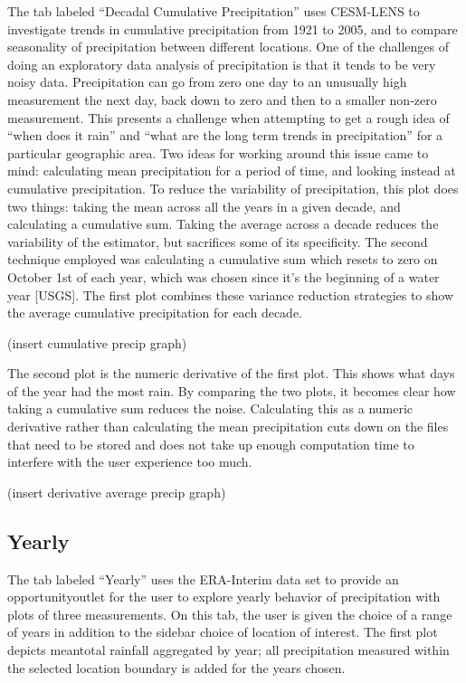 \documentclass[10pt,letterpaper]{article}
\begin{document}
The tab labeled “Decadal Cumulative Precipitation” uses CESM-LENS to investigate trends in cumulative precipitation from 1921 to 2005, and to compare seasonality of precipitation between different locations. One of the challenges of doing an exploratory data analysis of precipitation is that it tends to be very noisy data. Precipitation can go from zero one day to an unusually high measurement the next day, back down to zero and then to a smaller non-zero measurement. This presents a challenge when attempting to get a rough idea of “when does it rain” and “what are the long term trends in precipitation” for a particular geographic area. Two ideas for working around this issue came to mind: calculating mean precipitation for a period of time, and looking instead at cumulative precipitation.
        	To reduce the variability of precipitation, this
plot does two things: taking the mean across all the years in a given decade, and calculating a cumulative sum. Taking the average across a decade reduces the variability of the estimator, but sacrifices some of its specificity. The second technique employed was calculating a cumulative  sum which resets to zero on October 1st of each year, which was chosen since it’s the beginning of a water year [USGS]. The first plot combines these variance reduction strategies to show the average cumulative precipitation for each decade.

(insert cumulative precip graph)

The second plot is the numeric derivative of the first plot. This shows what days of the year had the most rain. By comparing the two plots, it becomes clear how taking a cumulative sum reduces the noise. Calculating this as a numeric derivative rather than calculating the mean precipitation cuts down on the files that need to be stored and does not take up enough computation time to interfere with the user experience too much.

(insert derivative average precip graph)

\subsection*{Yearly}

The tab labeled “Yearly” uses the ERA-Interim data set to provide an opportunityoutlet for the user to explore yearly behavior of precipitation with plots of three measurements. On this tab, the user is given the choice of a range of years in addition to the sidebar choice of location of interest. The first plot depicts meantotal rainfall aggregated by year; all precipitation measured within the selected location boundary is added for the years chosen.
\end{document}
